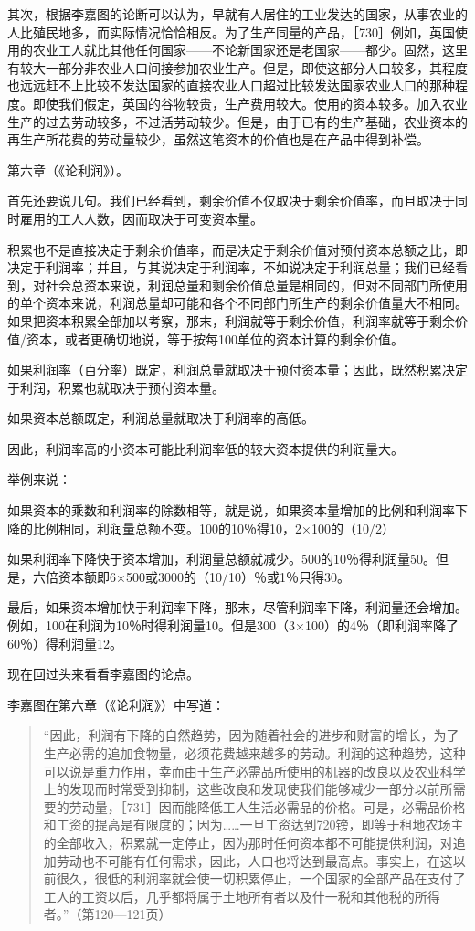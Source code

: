 其次，根据李嘉图的论断可以认为，早就有人居住的工业发达的国家，从事农业的人比殖民地多，而实际情况恰恰相反。为了生产同量的产品，［730］例如，英国使用的农业工人就比其他任何国家——不论新国家还是老国家——都少。固然，这里有较大一部分非农业人口间接参加农业生产。但是，即使这部分人口较多，其程度也远远赶不上比较不发达国家的直接农业人口超过比较发达国家农业人口的那种程度。即使我们假定，英国的谷物较贵，生产费用较大。使用的资本较多。加入农业生产的过去劳动较多，不过活劳动较少。但是，由于已有的生产基础，农业资本的再生产所花费的劳动量较少，虽然这笔资本的价值也是在产品中得到补偿。

第六章（《论利润》）。

首先还要说几句。我们已经看到，剩余价值不仅取决于剩余价值率，而且取决于同时雇用的工人人数，因而取决于可变资本量。

积累也不是直接决定于剩余价值率，而是决定于剩余价值对预付资本总额之比，即决定于利润率；并且，与其说决定于利润率，不如说决定于利润总量；我们已经看到，对社会总资本来说，利润总量和剩余价值总量是相同的，但对不同部门所使用的单个资本来说，利润总量却可能和各个不同部门所生产的剩余价值量大不相同。如果把资本积累全部加以考察，那末，利润就等于剩余价值，利润率就等于剩余价值/资本，或者更确切地说，等于按每100单位的资本计算的剩余价值。

如果利润率（百分率）既定，利润总量就取决于预付资本量；因此，既然积累决定于利润，积累也就取决于预付资本量。

如果资本总额既定，利润总量就取决于利润率的高低。

因此，利润率高的小资本可能比利润率低的较大资本提供的利润量大。

举例来说：

\todo{}

如果资本的乘数和利润率的除数相等，就是说，如果资本量增加的比例和利润率下降的比例相同，利润量总额不变。100的10％得10，2×100的（10/2）%

如果利润率下降快于资本增加，利润量总额就减少。500的10％得利润量50。但是，六倍资本额即6×500或3000的（10/10）％或1％只得30。

最后，如果资本增加快于利润率下降，那末，尽管利润率下降，利润量还会增加。例如，100在利润为10％时得利润量10。但是300（3×100）的4％（即利润率降了60％）得利润量12。

现在回过头来看看李嘉图的论点。

李嘉图在第六章（《论利润》）中写道：

\begin{quote}{“因此，利润有下降的自然趋势，因为随着社会的进步和财富的增长，为了生产必需的追加食物量，必须花费越来越多的劳动。利润的这种趋势，这种可以说是重力作用，幸而由于生产必需品所使用的机器的改良以及农业科学上的发现而时常受到抑制，这些改良和发现使我们能够减少一部分以前所需要的劳动量，［731］因而能降低工人生活必需品的价格。可是，必需品价格和工资的提高是有限度的；因为……一旦工资达到720镑，即等于租地农场主的全部收入，积累就一定停止，因为那时任何资本都不可能提供利润，对追加劳动也不可能有任何需求，因此，人口也将达到最高点。事实上，在这以前很久，很低的利润率就会使一切积累停止，一个国家的全部产品在支付了工人的工资以后，几乎都将属于土地所有者以及什一税和其他税的所得者。”（第120—121页）}\end{quote}

